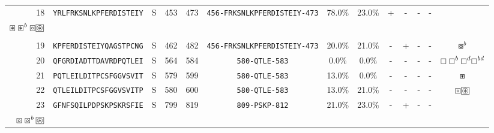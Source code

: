 \begin{tabular}{rcccccccccccc}
18 &  \texttt{YRLFRKSNLKPFERDISTEIY} &       S &    453 &   473 &  \texttt{{\scriptsize 456-}FRKSNLKPFERDISTEIY{\scriptsize -473}} &                          78.0\% &                           23.0\% &          + &           - &          - &           - &  \Centerstack{  $\boxempty \boxempty^b \boxempty^d \boxempty^{bd}$ \\  $\boxast \boxast^b \boxcircle \setlength{\fboxsep}{0.5pt} \boxed{\circledast}$ \\  } \\
19 &  \texttt{KPFERDISTEIYQAGSTPCNG} &       S &    462 &   482 &  \texttt{{\scriptsize 456-}FRKSNLKPFERDISTEIY{\scriptsize -473}} &                          20.0\% &                           21.0\% &          - &           + &          - &           - &                                                                                                                                            $ \boxcircle^b $ \\
20 &  \texttt{QFGRDIADTTDAVRDPQTLEI} &       S &    564 &   584 &                \texttt{{\scriptsize 580-}QTLE{\scriptsize -583}} &                           0.0\% &                            0.0\% &          - &           - &          - &           - &                                                                                                        $ \boxempty \boxempty^b \boxempty^d \boxempty^{bd} $ \\
21 &  \texttt{PQTLEILDITPCSFGGVSVIT} &       S &    579 &   599 &                \texttt{{\scriptsize 580-}QTLE{\scriptsize -583}} &                          13.0\% &                            0.0\% &          - &           - &          - &           - &                                                                                                                                                 $ \boxast $ \\
22 &  \texttt{QTLEILDITPCSFGGVSVITP} &       S &    580 &   600 &                \texttt{{\scriptsize 580-}QTLE{\scriptsize -583}} &                          13.0\% &                           21.0\% &          - &           - &          - &           - &                                                                                              $ \boxcircle \setlength{\fboxsep}{0.5pt} \boxed{\circledast} $ \\
23 &  \texttt{GFNFSQILPDPSKPSKRSFIE} &       S &    799 &   819 &                \texttt{{\scriptsize 809-}PSKP{\scriptsize -812}} &                          21.0\% &                           23.0\% &          - &           + &          - &           - &           \Centerstack{  $\boxempty \boxempty^b \boxempty^d \boxempty^{bd}$ \\  $\boxcircle \boxcircle^b \setlength{\fboxsep}{0.5pt} \boxed{\circledast}$ } \\

\end{tabular}
